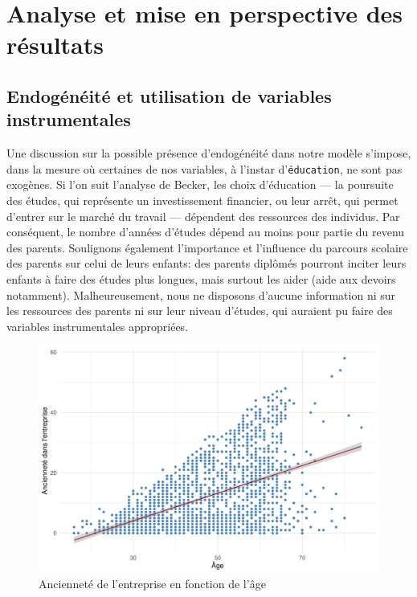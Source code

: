 \documentclass[a4paper, french, 11 pt]{article}\usepackage[]{graphicx}\usepackage[]{xcolor}
\makeatletter
\newenvironment{kframe}{%
 \def\at@end@of@kframe{}%
 \ifinner\ifhmode%
  \def\at@end@of@kframe{\end{minipage}}%
  \begin{minipage}{\columnwidth}%
 \fi\fi%
 \def\FrameCommand##1{\hskip\@totalleftmargin \hskip-\fboxsep
 \colorbox{shadecolor}{##1}\hskip-\fboxsep
     \hskip-\linewidth \hskip-\@totalleftmargin \hskip\columnwidth}%
 \MakeFramed {\advance\hsize-\width
   \@totalleftmargin\z@ \linewidth\hsize
   \@setminipage}}%
 {\par\unskip\endMakeFramed%
 \at@end@of@kframe}
\newenvironment{knitrout}{}{} %
\makeatother
\begin{document}
\section{Analyse et mise en perspective des résultats}

\subsection{Endogénéité et utilisation de variables instrumentales}

        Une discussion sur la possible présence d’endogénéité dans notre modèle s’impose, dans la mesure où certaines de nos variables, à l'instar d'\texttt{éducation}, ne sont pas exogènes. Si l'on suit l'analyse de Becker, les choix d'éducation --- la poursuite des études, qui représente un investissement financier, ou leur arrêt, qui permet d'entrer sur le marché du travail --- dépendent des ressources des individus. Par conséquent, le nombre d'années d'études dépend au moins pour partie du revenu des parents. Soulignons également l’importance et l’influence du parcours scolaire des parents sur celui de leurs enfants: des parents diplômés pourront inciter leurs enfants à faire des études plus longues, mais surtout les aider (aide aux devoirs notamment). Malheureusement, nous ne disposons d'aucune information ni sur les ressources des parents ni sur leur niveau d'études, qui auraient pu faire des variables instrumentales appropriées. 

\begin{knitrout}
\color{fgcolor}\begin{kframe}


{\ttfamily\noindent\itshape{}}\end{kframe}
\end{knitrout}

\begin{figure}[h]
\center
\includegraphics[width=0.7\linewidth]{figure/exp_age.pdf}
\caption{Ancienneté de l'entreprise en fonction de l'âge\label{fig:exp_age}}
\end{figure}
\end{document}
